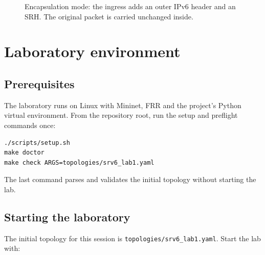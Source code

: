\documentclass[11pt,letterpaper]{report}
\newcommand{\code}[1]{\texttt{#1}}
\begin{document}
\begin{figure}[htbp]
  \centering
  \caption{Encapsulation mode: the ingress adds an outer IPv6 header and an
  SRH.  The original packet is carried unchanged inside.}
  \label{fig:encap}
\end{figure}

\chapter{Laboratory environment}

\section{Prerequisites}

The laboratory runs on Linux with Mininet, FRR and the project's Python
virtual environment.  From the repository root, run the setup and preflight
commands once:

\begin{lstlisting}
./scripts/setup.sh
make doctor
make check ARGS=topologies/srv6_lab1.yaml
\end{lstlisting}

The last command parses and validates the initial topology without starting the
lab.

\section{Starting the laboratory}

The initial topology for this session is \code{topologies/srv6\_lab1.yaml}.
Start the lab with:
\end{document}
